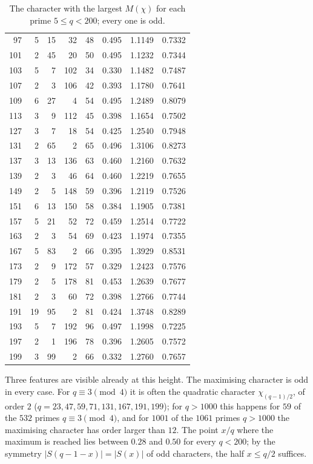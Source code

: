 \documentclass[11pt,a4paper,reqno]{amsart}
\theoremstyle{remark}
\numberwithin{equation}{section}
\begin{document}
\begin{table}[ht]
\begin{tabular}{@{}rrrrrccc@{}}
97 & 5 & 15 & 32 & 48 & 0.495 & 1.1149 & 0.7332\\
101 & 2 & 45 & 20 & 50 & 0.495 & 1.1232 & 0.7344\\
103 & 5 & 7 & 102 & 34 & 0.330 & 1.1482 & 0.7487\\
107 & 2 & 3 & 106 & 42 & 0.393 & 1.1780 & 0.7641\\
109 & 6 & 27 & 4 & 54 & 0.495 & 1.2489 & 0.8079\\
113 & 3 & 9 & 112 & 45 & 0.398 & 1.1654 & 0.7502\\
127 & 3 & 7 & 18 & 54 & 0.425 & 1.2540 & 0.7948\\
131 & 2 & 65 & 2 & 65 & 0.496 & 1.3106 & 0.8273\\
137 & 3 & 13 & 136 & 63 & 0.460 & 1.2160 & 0.7632\\
139 & 2 & 3 & 46 & 64 & 0.460 & 1.2219 & 0.7655\\
149 & 2 & 5 & 148 & 59 & 0.396 & 1.2119 & 0.7526\\
151 & 6 & 13 & 150 & 58 & 0.384 & 1.1905 & 0.7381\\
157 & 5 & 21 & 52 & 72 & 0.459 & 1.2514 & 0.7722\\
163 & 2 & 3 & 54 & 69 & 0.423 & 1.1974 & 0.7355\\
167 & 5 & 83 & 2 & 66 & 0.395 & 1.3929 & 0.8531\\
173 & 2 & 9 & 172 & 57 & 0.329 & 1.2423 & 0.7576\\
179 & 2 & 5 & 178 & 81 & 0.453 & 1.2639 & 0.7677\\
181 & 2 & 3 & 60 & 72 & 0.398 & 1.2766 & 0.7744\\
191 & 19 & 95 & 2 & 81 & 0.424 & 1.3748 & 0.8289\\
193 & 5 & 7 & 192 & 96 & 0.497 & 1.1998 & 0.7225\\
197 & 2 & 1 & 196 & 78 & 0.396 & 1.2605 & 0.7572\\
199 & 3 & 99 & 2 & 66 & 0.332 & 1.2760 & 0.7657\\
\bottomrule
\end{tabular}
\caption{The character with the largest $M(\chi)$ for each prime $5\le q<200$; every one is odd.}
\label{tab:small}
\end{table}

Three features are visible already at this height. The maximising character is odd in every case. For $q\equiv3\pmod 4$ it is often the quadratic character $\chi_{(q-1)/2}$, of order $2$ ($q=23,47,59,71,131,167,191,199$); for $q>1000$ this happens for $59$ of the $532$ primes $q\equiv3\pmod4$, and for $1001$ of the $1061$ primes $q>1000$ the maximising character has order larger than $12$. The point $x/q$ where the maximum is reached lies between $0.28$ and $0.50$ for every $q<200$; by the symmetry $|S(q-1-x)|=|S(x)|$ of odd characters, the half $x\le q/2$ suffices.
\end{document}
